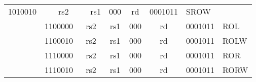 \begin{table}[p]
\begin{small}
\begin{center}
\begin{tabular}{p{0in}p{0.4in}p{0.05in}p{0.05in}p{0.05in}p{0.05in}p{0.4in}p{0.6in}p{0.4in}p{0.6in}p{0.7in}l}
\multicolumn{4}{|c|}{1010010} &
\multicolumn{2}{c|}{rs2} &
\multicolumn{1}{c|}{rs1} &
\multicolumn{1}{c|}{000} &
\multicolumn{1}{c|}{rd} &
\multicolumn{1}{c|}{0001011} & SROW \\
%
\cline{2-11} &
\multicolumn{4}{|c|}{1100000} &
\multicolumn{2}{c|}{rs2} &
\multicolumn{1}{c|}{rs1} &
\multicolumn{1}{c|}{000} &
\multicolumn{1}{c|}{rd} &
\multicolumn{1}{c|}{0001011} & ROL \\
%
\cline{2-11} &
\multicolumn{4}{|c|}{1100010} &
\multicolumn{2}{c|}{rs2} &
\multicolumn{1}{c|}{rs1} &
\multicolumn{1}{c|}{000} &
\multicolumn{1}{c|}{rd} &
\multicolumn{1}{c|}{0001011} & ROLW \\
%
\cline{2-11} &
\multicolumn{4}{|c|}{1110000} &
\multicolumn{2}{c|}{rs2} &
\multicolumn{1}{c|}{rs1} &
\multicolumn{1}{c|}{000} &
\multicolumn{1}{c|}{rd} &
\multicolumn{1}{c|}{0001011} & ROR \\
%
\cline{2-11} &
\multicolumn{4}{|c|}{1110010} &
\multicolumn{2}{c|}{rs2} &
\multicolumn{1}{c|}{rs1} &
\multicolumn{1}{c|}{000} &
\multicolumn{1}{c|}{rd} &
\multicolumn{1}{c|}{0001011} & RORW \\
%
\cline{2-11}
\end{tabular}
\end{center}
\end{small}
\label{instr-table}
\end{table}
